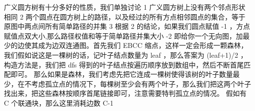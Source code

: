 {}\markdownRendererInterblockSeparator
{}广义圆方树有十分多好的性质，我们单独讨论\markdownRendererParagraphSeparator
{}\markdownRendererDollarSign{} 1 \markdownRendererDollarSign{}广义圆方树上没有两个邻点形状相同\markdownRendererParagraphSeparator
{}\markdownRendererDollarSign{} 2 \markdownRendererDollarSign{}两个圆点在圆方树上的路径，以及经过的所有方点相邻圆点的集合，等于原图中两点间所有简单路径的并集\markdownRendererParagraphSeparator
{}\markdownRendererDollarSign{} 3 \markdownRendererDollarSign{}根据\markdownRendererDollarSign{} 2 \markdownRendererDollarSign{}的结论，如果我们圆点赋值\markdownRendererDollarSign{} -1 \markdownRendererDollarSign{}，方点赋值点双大小,那么路径权值和等于简单路径并集大小\markdownRendererDollarSign{} -2 \markdownRendererDollarSign{}\markdownRendererInterblockSeparator
{}
\markdownRendererSectionEnd \markdownRendererSectionBegin
{}\markdownRendererInterblockSeparator
{}\markdownRendererInterblockSeparator
{}
\markdownRendererSectionEnd \markdownRendererSectionBegin
{}\markdownRendererInterblockSeparator
{}\markdownRendererInterblockSeparator
{}
\markdownRendererSectionEnd \markdownRendererSectionBegin
{}\markdownRendererInterblockSeparator
{}即给你一个无向图，加最少的边使其成为边双连通图。首先我们\markdownRendererDollarSign{} EBCC \markdownRendererDollarSign{}缩点，这样一定会形成一颗森林，\markdownRendererParagraphSeparator
{}我们假如说这是一棵树的话，记叶子结点数量为\markdownRendererDollarSign{} leaf \markdownRendererDollarSign{}，那么答案为\markdownRendererDollarSign{} (leaf+1)/2 \markdownRendererDollarSign{}，构造方法是，我们把\markdownRendererDollarSign{} dfs \markdownRendererDollarSign{}得到的叶子结点按遍历顺序放到数组中，然后不断首尾匹配即可。\markdownRendererParagraphSeparator
{}那么如果是森林，我们考虑先把它连成一棵树使得该树的叶子数量最少，在不考虑孤立点的情况下，每棵树至少会有两个叶子，那么我们把这两个叶子找出来，把这些森林按顺序首尾链接即可，注意需要特判孤立点的情况。\markdownRendererParagraphSeparator
{}假如有\markdownRendererDollarSign{} C \markdownRendererDollarSign{}个联通块，那么这里消耗边数\markdownRendererDollarSign{} C-1 \markdownRendererDollarSign{}\markdownRendererInterblockSeparator
{}
\markdownRendererSectionEnd 
